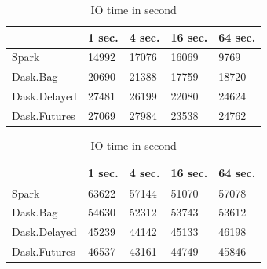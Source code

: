 \documentclass[conference]{IEEEtran}
\begin{document}
\begin{table}[!t]
    \caption{Function time for the sleep experiment}
    \begin{subtable}[b]{\columnwidth}
        \renewcommand{\arraystretch}{1.3}
        \caption{Overhead time in second}\label{tab:inc_sleep_overhead}
        \centering
        \begin{tabular}{lllll}
        \hline
                     & 1 sec. & 4 sec. & 16 sec. & 64 sec. \\ \hline
        Spark        & 14992  & 17076  & 16069   & 9769    \\
        Dask.Bag     & 20690  & 21388  & 17759   & 18720   \\
        Dask.Delayed & 27481  & 26199  & 22080   & 24624   \\
        Dask.Futures & 27069  & 27984  & 23538   & 24762   \\ \hline
        \end{tabular}
    \end{subtable}
    \vskip 0.2cm
    \begin{subtable}[b]{\columnwidth}
        \renewcommand{\arraystretch}{1.3}
        \caption{IO time in second}\label{tab:inc_sleep_io}
        \centering
        \begin{tabular}{lllll}
        \hline
                     & 1 sec. & 4 sec. & 16 sec. & 64 sec. \\ \hline
        Spark        & 63622  & 57144  & 51070   & 57078   \\
        Dask.Bag     & 54630  & 52312  & 53743   & 53612   \\
        Dask.Delayed & 45239  & 44142  & 45133   & 46198   \\
        Dask.Futures & 46537  & 43161  & 44749   & 45846   \\ \hline
        \end{tabular}
    \end{subtable}
 \end{table}
\end{document}
